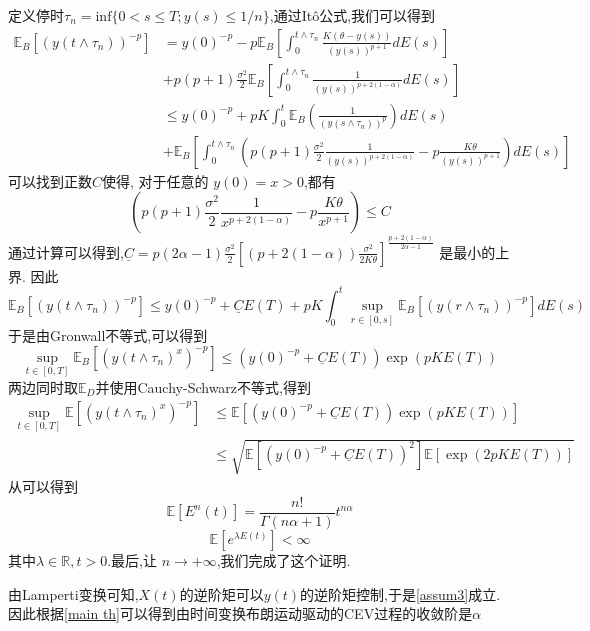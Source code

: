 \documentclass[12pt,final]{article}
\makeatletter
\theoremstyle{plain}
\renewcommand{\proofname}{Proof}
\theoremstyle{Definition}
\theoremstyle{Remark}
\renewenvironment{proof}[1][\proofname]{\par
	\pushQED{\qed}%
	\normalfont \topsep6\p@\@plus6\p@\relax
	\trivlist\item[\hskip\labelsep
	\bfseries #1\@addpunct{\,:\,}]\ignorespaces
}{%
	\popQED\endtrivlist\@endpefalse
}
\makeatother
\begin{document}
	\begin{proof}
	定义停时$\tau_{n}=\mathrm{inf}\{0<s\leq T;y(s)\leq1/n\}$,通过It\^{o}公式,我们可以得到
	$$\begin{aligned}
		\mathbb{E}_B\left[(y(t\wedge\tau_{n}))^{-p}\right] &=y(0)^{-p}-p\mathbb{E}_B\left[\int_{0}^{t\wedge\tau_{n}}\frac{K(\theta-y(s))}{(y(s))^{p+1}}dE(s)\right]\\
		&+p(p+1)\frac{\sigma^{2}}{2}\mathbb{E}_B\left[\int_{0}^{t\wedge\tau_{n}}\frac{1}{(y(s))^{p+2(1-\alpha)}}dE(s)\right] \\
		&\leq y(0)^{-p}+pK\int_{0}^{t}\mathbb{E}_B\left(\frac{1}{(y(s\wedge\tau_{n}))^{p}}
		\right)dE(s) \\
		&+\mathbb{E}_B\left[\int_0^{t\wedge\tau_n}\left(p(p+1)\frac{\sigma^2}{2}\frac{1}{(y(s))^{p+2(1-\alpha)}}-p\frac{K\theta}{(y(s))^{p+1}}\right)dE(s)\right]
	\end{aligned}$$
	可以找到正数$C$使得, 对于任意的 $y(0)=x>0$,都有
	$$\left(p(p+1)\frac{\sigma^2}{2}\frac{1}{x^{p+2(1-\alpha)}}-p\frac{K\theta}{x^{p+1}}\right)\leq C$$
	通过计算可以得到,$\underline C=p(2\alpha-1)\frac{\sigma^2}{2}\left[(p+2(1-\alpha))\frac{\sigma^2}{2K\theta}\right]^{\frac{p+2(1-\alpha)}{2\alpha-1}}$ 是最小的上界. 因此
	$$\mathbb{E}_B\left[(y(t\wedge\tau_n))^{-p}\right]\leq y(0)^{-p}+\underline{C}E(T)+pK\int_0^t\sup_{r\in[0,s]}\mathbb{E}_B\left[(y(r\wedge\tau_n))^{-p}\right]dE(s)$$
	于是由Gronwall不等式,可以得到
	$$\sup\limits_{t\in[0,T]}\mathbb{E}_B\left[(y(t\wedge\tau_n)^x)^{-p}\right]\leq\left(y(0)^{-p}+\underline{C}E(T)\right)\exp(pKE(T))$$
	两边同时取$\mathbb{E}_D$并使用Cauchy-Schwarz不等式,得到
	$$\begin{aligned}
		\sup\limits_{t\in[0,T]}\mathbb{E}\left[(y(t\wedge\tau_n)^x)^{-p}\right]&\leq\mathbb{E}\left[\left(y(0)^{-p}+\underline{C}E(T)\right)\exp(pKE(T))\right]\\
		&\leq\sqrt{\mathbb{E}\left[\left(y(0)^{-p}+\underline{C}E(T)\right)^2\right]\mathbb{E}\left[\exp(2pKE(T))\right]}
	\end{aligned}$$
	从\cite{jum2014strong}可以得到
	\begin{equation}
		\mathbb{E}[E^n(t)]=\frac{n!}{\Gamma(n\alpha+1)}t^{n\alpha}
	\end{equation}
	\begin{equation}
		\mathbb{E}[e^{\lambda E(t)}]<\infty
	\end{equation}
	其中$\lambda \in \mathbb{R},t>0$.最后,让 $n\to+\infty$,我们完成了这个证明.
	\end{proof}
	
	
	由Lamperti变换可知,$X(t)$的逆阶矩可以$y(t)$的逆阶矩控制,于是\cref{assum3}成立.因此根据\cref{main th}可以得到由时间变换布朗运动驱动的CEV过程的收敛阶是$\alpha$
	\
	
\end{document}
